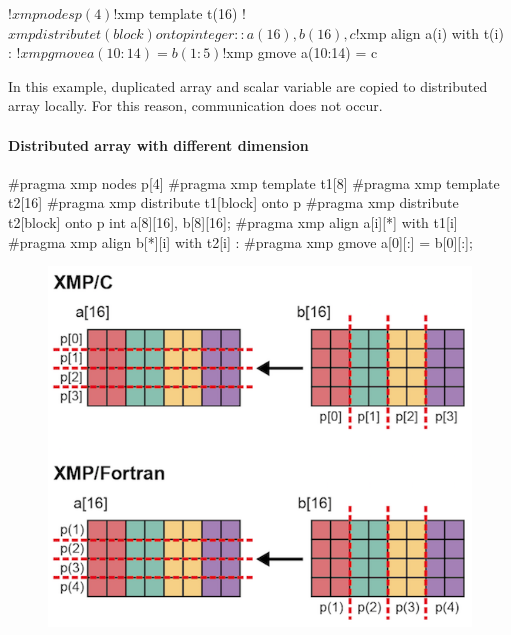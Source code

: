 \begin{XFexample}
 !$xmp nodes p(4)
 !$xmp template t(16)
 !$xmp distribute t(block) onto p
 integer :: a(16), b(16), c
 !$xmp align a(i) with t(i)
      :
!$xmp gmove
   a(10:14) = b(1:5)

!$xmp gmove
   a(10:14) = c
\end{XFexample}

In this example, duplicated array and scalar variable are copied to
distributed array locally. For this reason, communication does not
occur.

\paragraph{Distributed array with different dimension}

\begin{XCexample}
#pragma xmp nodes p[4]
#pragma xmp template t1[8]
#pragma xmp template t2[16]
#pragma xmp distribute t1[block] onto p
#pragma xmp distribute t2[block] onto p
int a[8][16], b[8][16];
#pragma xmp align a[i][*] with t1[i]
#pragma xmp align b[*][i] with t2[i]
     :
#pragma xmp gmove
  a[0][:] = b[0][:];
\end{XCexample}


\begin{figure}
  \centering
  \includegraphics{figs/gmove_different.png}
\end{figure}

